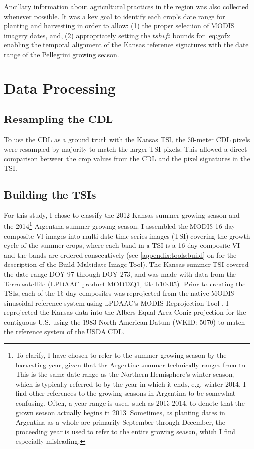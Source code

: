 Ancillary information about agricultural practices in the region was also collected whenever possible. It was a key goal to identify each crop's date range for planting and harvesting in order to allow: (1) the proper selection of MODIS imagery dates, and, (2) appropriately setting the $tshift$ bounds for \autoref{eq:gofx}, enabling the temporal alignment of the Kansas reference signatures with the date range of the Pellegrini growing season.

\section{Data Processing}

\subsection{Resampling the CDL}

To use the CDL as a ground truth with the Kansas TSI, the 30-meter CDL pixels were resampled by majority to match the larger TSI pixels. This allowed a direct comparison between the crop values from the CDL and the pixel signatures in the TSI.

\subsection{Building the TSIs}
\label{buildingTSIs}

For this study, I chose to classify the 2012 Kansas summer growing season and the 2014\footnote{To clarify, I have chosen to refer to the summer growing season by the harvesting year, given that the Argentine summer technically ranges from  to . This is the same date range as the Northern Hemisphere's winter season, which is typically referred to by the year in which it ends, e.g. winter 2014. I find other references to the growing seasons in Argentina to be somewhat confusing. Often, a year range is used, such as 2013-2014, to denote that the grown season actually begins in 2013. Sometimes, as planting dates in Argentina as a whole are primarily September through December, the proceeding year is used to refer to the entire growing season, which I find especially misleading.} Argentina summer growing season. I assembled the MODIS 16-day composite VI images into multi-date time-series images (TSI) covering the growth cycle of the summer crops, where each band in a TSI is a 16-day composite VI and the bands are ordered consecutively (see \autoref{appendix:tools:build} on  for the description of the Build Multidate Image Tool). The Kansas summer TSI covered the date range DOY 97 through DOY 273, and was made with data from the Terra satellite (LPDAAC product MOD13Q1, tile h10v05). Prior to creating the TSIs, each of the 16-day composites was reprojected from the native MODIS sinusoidal reference system using LPDAAC's MODIS Reprojection Tool \autocite{modis4.1}. I reprojected the Kansas data into the Albers Equal Area Conic projection for the contiguous U.S. using the 1983 North American Datum (WKID: 5070) to match the reference system of the USDA CDL.


